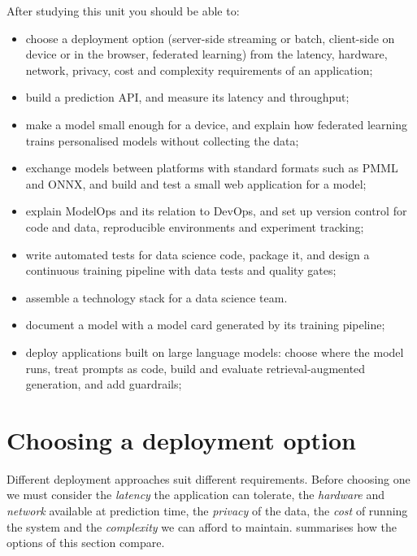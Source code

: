 \begin{objectives}
After studying this unit you should be able to:
\begin{itemize}
  \item choose a deployment option (server-side streaming or batch, client-side on device or in
        the browser, federated learning) from the latency, hardware, network, privacy, cost and
        complexity requirements of an application;
  \item build a prediction API, and measure its latency and throughput;
  \item make a model small enough for a device, and explain how federated learning trains
        personalised models without collecting the data;
  \item exchange models between platforms with standard formats such as PMML and ONNX, and
        build and test a small web application for a model;
  \item explain ModelOps and its relation to DevOps, and set up version control for code and data,
        reproducible environments and experiment tracking;
  \item write automated tests for data science code, package it, and design a continuous training
        pipeline with data tests and quality gates;
  \item assemble a technology stack for a data science team.
  \item document a model with a model card generated by its training pipeline;
\item deploy applications built on large language models: choose where the model runs, treat prompts
        as code, build and evaluate retrieval-augmented generation, and add guardrails;
\end{itemize}
\end{objectives}

\section{Choosing a deployment option}\label{sec:deployoptions}

Different deployment approaches suit different requirements. Before choosing one we must consider
the \emph{latency} the application can tolerate, the \emph{hardware} and \emph{network} available
at prediction time, the \emph{privacy} of the data, the \emph{cost} of running the system and the
\emph{complexity} we can afford to maintain.  summarises how the options of this
section compare.

